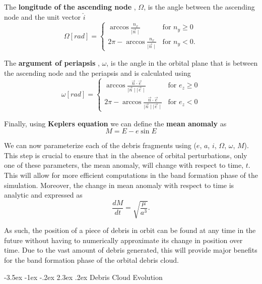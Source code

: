 \documentclass[a4paper, 12pt]{article}
\makeatletter
\renewcommand\section{\clearpage\newpage\@startsection {section}{1}{\z@}%
	{-3.5ex \@plus -1ex \@minus -.2ex}%
	{2.3ex \@plus.2ex}%
	{\normalfont\Large\bfseries}}
\newcommand{\lindex}[1]{%
	\lowercase{\def\temp{#1}}%
	\expandafter\index\expandafter{\temp}%
}
\newcommand{\boldindex}[1]{%
	\textbf{#1}\lindex{#1}%
}
\makeatother
\begin{document}
The \boldindex{longitude of the ascending node}, $\Omega$, is the angle between the ascending node and the unit vector $\hat{i}$
\begin{equation}
	\Omega [rad] = \begin{cases}
		\arccos \frac{n_x}{\mid \vec{n} \mid} & \text{for } n_y \geq 0 \\
		2\pi -	\arccos \frac{n_x}{\mid \vec{n} \mid} & \text{for } n_y < 0.
	\end{cases}
\end{equation}

The \boldindex{argument of periapsis}, $\omega$, is the angle in the orbital plane that is between the ascending node and the periapsis and is calculated using
\begin{equation}
	\omega [rad] = \begin{cases}
		\arccos \frac{\vec{n} \cdot \vec{e}}{\mid \vec{n} \mid \mid \vec{e} \mid} & \text{for } e_z \geq 0 \\
		2\pi -\arccos \frac{\vec{n} \cdot \vec{e}}{\mid \vec{n} \mid \mid \vec{e} \mid}& \text{for } e_z < 0	
	\end{cases}
\end{equation}

Finally, using \boldindex{Keplers equation} we can define the \boldindex{mean anomaly} as
\begin{equation}
	M = E - e\sin E
\end{equation}

We can now parameterize each of the debris fragments using ($e$, $a$, $i$, $\Omega$, $\omega$, $M$). This step is crucial to ensure that in the absence of orbital perturbations, only one of these parameters, the mean anomaly, will change with respect to time, $t$. This will allow for more efficient computations in the band formation phase of the simulation. Moreover, the change in mean anomaly with respect to time is analytic and expressed as
\begin{equation}
\frac{dM}{dt} = \sqrt{\frac{\mu}{a^3}}.
\end{equation}

As such, the position of a piece of debris in orbit can be found at any time in the future without having to numerically approximate its change in position over time. Due to the vast amount of debris generated, this will provide major benefits for the band formation phase of the orbital debris cloud.

\newpage
\section{Debris Cloud Evolution}
\end{document}
